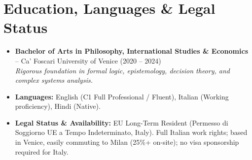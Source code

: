 \documentclass[a4paper,10pt]{article}
\begin{document}
\section{Education, Languages \& Legal Status}
\begin{itemize}
  \item \textbf{Bachelor of Arts in Philosophy, International Studies \& Economics} -- Ca' Foscari University of Venice (2020 -- 2024) \\
  \textit{Rigorous foundation in formal logic, epistemology, decision theory, and complex systems analysis.}
  \item \textbf{Languages:} English (C1 Full Professional / Fluent), Italian (Working proficiency), Hindi (Native).
  \item \textbf{Legal Status \& Availability:} EU Long-Term Resident (Permesso di Soggiorno UE a Tempo Indeterminato, Italy). Full Italian work rights; based in Venice, easily commuting to Milan (25\%+ on-site); no visa sponsorship required for Italy.
\end{itemize}
\end{document}
